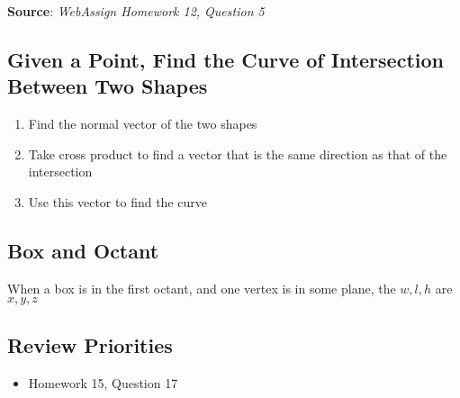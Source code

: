     \textbf{Source}: \textit{WebAssign Homework 12, Question 5}

  \subsection{Given a Point, Find the Curve of Intersection Between Two Shapes}

    \begin{enumerate}
      \item Find the normal vector of the two shapes
      \item Take cross product to find a vector that is the same direction
      as that of the intersection
      \item Use this vector to find the curve
    \end{enumerate}

  \subsection{Box and Octant}

    When a box is in the first octant, and one vertex is in
    some plane, the $ w, l, h $ are $ x, y, z $

  \subsection{Review Priorities}

    \begin{itemize}
      \item Homework 15, Question 17
    \end{itemize}